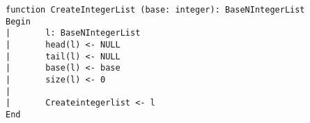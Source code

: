 \begin{lstlisting}[breaklines]
function CreateIntegerList (base: integer): BaseNIntegerList
Begin
|       l: BaseNIntegerList
|       head(l) <- NULL
|       tail(l) <- NULL
|       base(l) <- base
|       size(l) <- 0
|
|       Createintegerlist <- l
End
\end{lstlisting}
